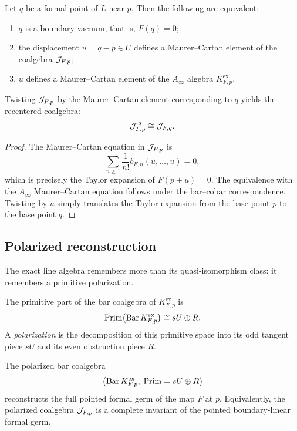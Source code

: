 \begin{theorem}%
Let $q$ be a formal point of $L$ near $p$. Then the following are equivalent:
\begin{enumerate}[label=(\roman*),leftmargin=1.8em]
\item $q$ is a boundary vacuum, that is, $F(q)=0$;
\item the displacement $u=q-p\in U$ defines a Maurer--Cartan element of the coalgebra $\mathcal J_{F,p}$;
\item $u$ defines a Maurer--Cartan element of the $A_\infty$ algebra $K^{\mathrm{ex}}_{F,p}$.
\end{enumerate}
Twisting $\mathcal J_{F,p}$ by the Maurer--Cartan element corresponding to $q$ yields the recentered coalgebra:
\[
\mathcal J_{F,p}^{\,q}\cong \mathcal J_{F,q}.
\]
\end{theorem}

\begin{proof}
The Maurer--Cartan equation in $\mathcal J_{F,p}$ is
\[
\sum_{n\ge 1}\frac{1}{n!} b_{F,n}(u,\dots,u)=0,
\]
which is precisely the Taylor expansion of $F(p+u)=0$. The equivalence with the $A_\infty$ Maurer--Cartan equation follows under the bar--cobar correspondence. Twisting by $u$ simply translates the Taylor expansion from the base point $p$ to the base point $q$.
\end{proof}

\subsection{Polarized reconstruction}

The exact line algebra remembers more than its quasi-isomorphism class: it remembers a primitive polarization.

\begin{definition}
The primitive part of the bar coalgebra of $K^{\mathrm{ex}}_{F,p}$ is
\[
\mathrm{Prim}\bigl(\operatorname{Bar} K^{\mathrm{ex}}_{F,p}\bigr)\cong sU\oplus R.
\]
A \emph{polarization} is the decomposition of this primitive space into its odd tangent piece $sU$ and its even obstruction piece $R$.
\end{definition}

\begin{theorem}%
The polarized bar coalgebra
\[
\bigl(\operatorname{Bar} K^{\mathrm{ex}}_{F,p},\; \mathrm{Prim}=sU\oplus R\bigr)
\]
reconstructs the full pointed formal germ of the map $F$ at $p$. Equivalently, the polarized coalgebra $\mathcal J_{F,p}$ is a complete invariant of the pointed boundary-linear formal germ.
\end{theorem}

